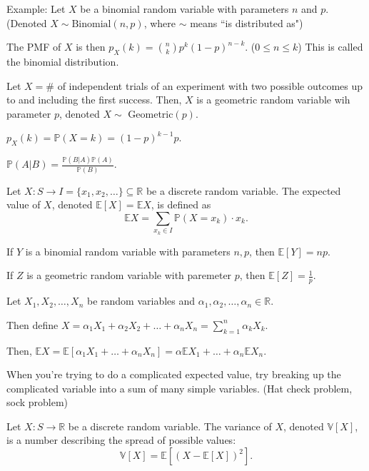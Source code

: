 \documentclass{article}
\begin{document}
    Example: Let $X$ be a binomial random variable with parameters $n$ and $p$. (Denoted $X \sim \text{Binomial}(n,p)$, where $\sim$ means ``is distributed as")
    
    The PMF of $X$ is then $p_X(k) = {n \choose k}p^k(1-p)^{n-k}$. ($0 \leq n \leq k$) This is called the binomial distribution.

\medskip
{}

    Let $X = \#$ of independent trials of an experiment with two possible outcomes up to and including the first success. Then, $X$ is a geometric random variable wih parameter $p$, denoted $X \sim$ Geometric$(p)$.
    
    $p_X(k) = \mathbb P(X = k) = (1 - p)^{k - 1}p$.
    
\medskip
{}

    $\mathbb P(A|B) = \frac{\mathbb P(B|A)\mathbb P(A)}{\mathbb P(B)}$.
    
\medskip
{}

    Let $X:S \to I = \{x_1, x_2, \hdots\} \subseteq \mathbb R$ be a discrete random variable. The expected value of $X$, denoted $\mathbb E[X] = \mathbb EX$, is defined as $$\mathbb EX = \sum_{x_k \in I}\mathbb P(X=x_k)\cdot x_k.$$
    
    If $Y$ is a binomial random variable with parameters $n, p$, then $\mathbb E[Y] = np$.
    
    If $Z$ is a geometric random variable with paremeter $p$, then $\mathbb E[Z] = \frac1p$.
    
\medskip
{}

    Let $X_1, X_2, \hdots, X_n$ be random variables and $\alpha_1, \alpha_2, \hdots, \alpha_n \in \mathbb R$.
    
    Then define $X = \alpha_1X_1 + \alpha_2X_2 + \hdots + \alpha_nX_n = \sum_{k=1}^n\alpha_kX_k$.
    
    Then, $\mathbb EX = \mathbb E[\alpha_1X_1 + \hdots + \alpha_nX_n] = \alpha\mathbb EX_1 + \hdots + \alpha_n \mathbb EX_n$.

\medskip
{}

    When you're trying to do a complicated expected value, try breaking up the complicated variable into a sum of many simple variables. (Hat check problem, sock problem)

\medskip
{}

    Let $X:S \to \mathbb R$ be a discrete random variable. The variance of $X$, denoted $\mathbb V[X]$, is a number describing the spread of possible values: $$\mathbb V[X] = \mathbb E[(X - \mathbb E[X])^2].$$
    
\end{document}
